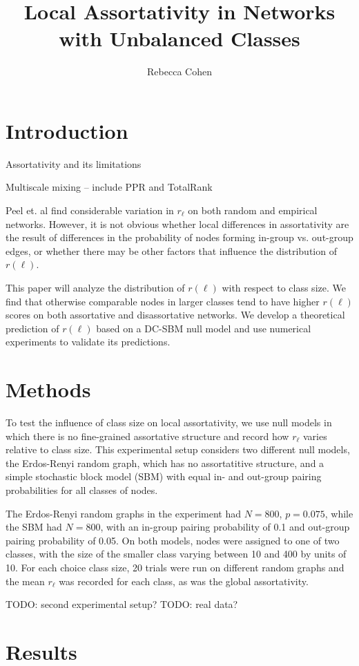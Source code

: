 \documentclass[12pt]{article}
\title{Local Assortativity in Networks with Unbalanced Classes}
\author{Rebecca Cohen}
\begin{document}
\maketitle
\section{Introduction}
Assortativity and its limitations

Multiscale mixing -- include PPR and TotalRank

Peel et. al find considerable variation in $r_\ell$ on both random and empirical networks.  However, it is not obvious whether local differences in assortativity are the result of differences in the probability of nodes forming in-group vs. out-group edges, or whether there may be other factors that influence the distribution of $r(\ell)$.

This paper will analyze the distribution of $r(\ell)$ with respect to class size.  We find that otherwise comparable nodes in larger classes tend to have higher $r(\ell)$ scores on both assortative and disassortative networks.  We develop a theoretical prediction of $r(\ell)$ based on a DC-SBM null model and use numerical experiments to validate its predictions.

\section{Methods}
To test the influence of class size on local assortativity, we use null models in which there is no fine-grained assortative structure and record how $r_\ell$ varies relative to class size.  This experimental setup considers two different null models, the Erdos-Renyi random graph, which has no assortatitive structure, and a simple stochastic block model (SBM) with equal in- and out-group pairing probabilities for all classes of nodes.

The Erdos-Renyi random graphs in the experiment had $N=800$, $p=0.075$, while the SBM had $N=800$, with an in-group pairing probability of 0.1 and out-group pairing probability of 0.05.  On both models, nodes were assigned to one of two classes, with the size of the smaller class varying between 10 and 400 by units of 10.  For each choice class size, 20 trials were run on different random graphs and the mean $r_\ell$ was recorded for each class, as was the global assortativity.

TODO: second experimental setup?
TODO: real data?

\section{Results}
\end{document}

